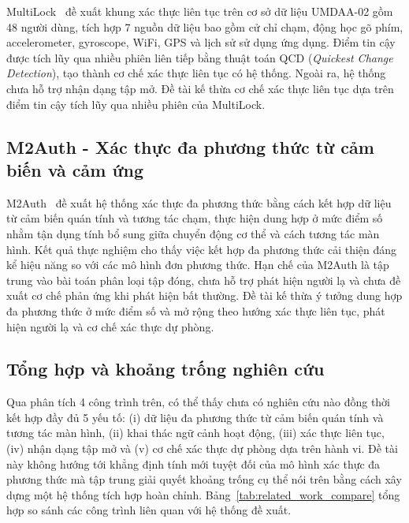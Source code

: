 \documentclass[../DoAn.tex]{subfiles}
\begin{document}
MultiLock~\cite{multilock} đề xuất khung xác thực liên tục trên cơ sở dữ liệu UMDAA-02 gồm 48 người dùng, tích hợp 7 nguồn dữ liệu bao gồm cử chỉ chạm, động học gõ phím, accelerometer, gyroscope, WiFi, GPS và lịch sử sử dụng ứng dụng. Điểm tin cậy được tích lũy qua nhiều phiên liên tiếp bằng thuật toán QCD (\textit{Quickest Change Detection}), tạo thành cơ chế xác thực liên tục có hệ thống. Ngoài ra, hệ thống chưa hỗ trợ nhận dạng tập mở. Đề tài kế thừa cơ chế xác thực liên tục dựa trên điểm tin cậy tích lũy qua nhiều phiên của MultiLock.

\subsection{M2Auth - Xác thực đa phương thức từ cảm biến và cảm ứng}

M2Auth~\cite{m2auth} đề xuất hệ thống xác thực đa phương thức bằng cách kết hợp dữ liệu từ cảm biến quán tính và tương tác chạm, thực hiện dung hợp ở mức điểm số nhằm tận dụng tính bổ sung giữa chuyển động cơ thể và cách tương tác màn hình. Kết quả thực nghiệm cho thấy việc kết hợp đa phương thức cải thiện đáng kể hiệu năng so với các mô hình đơn phương thức. Hạn chế của M2Auth là tập trung vào bài toán phân loại tập đóng, chưa hỗ trợ phát hiện người lạ và chưa đề xuất cơ chế phản ứng khi phát hiện bất thường. Đề tài kế thừa ý tưởng dung hợp đa phương thức ở mức điểm số và mở rộng theo hướng xác thực liên tục, phát hiện người lạ và cơ chế xác thực dự phòng.

\subsection{Tổng hợp và khoảng trống nghiên cứu}

Qua phân tích 4 công trình trên, có thể thấy chưa có nghiên cứu nào đồng thời kết hợp đầy đủ 5 yếu tố: (i) dữ liệu đa phương thức từ cảm biến quán tính và tương tác màn hình, (ii) khai thác ngữ cảnh hoạt động, (iii) xác thực liên tục, (iv) nhận dạng tập mở và (v) cơ chế xác thực dự phòng dựa trên hành vi. Đề tài này không hướng tới khẳng định tính mới tuyệt đối của mô hình xác thực đa phương thức mà tập trung giải quyết khoảng trống cụ thể nói trên bằng cách xây dựng một hệ thống tích hợp hoàn chỉnh. Bảng~\ref{tab:related_work_compare} tổng hợp so sánh các công trình liên quan với hệ thống đề xuất.
\end{document}

